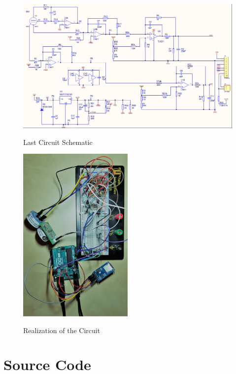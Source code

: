 \begin{figure}
	\begin{center}
		\includegraphics[width=1\textwidth]{Pics/6}
		\caption{Last Circuit Schematic}
		\label{fig:A.3}
		\vspace{1.2cm}
		\includegraphics[width=0.5\textwidth]{Pics/7}
		\caption{Realization of the Circuit}
		\label{fig:A.4}
		\medskip
	\end{center}
\end{figure}

\chapter{Source Code}
\label{sub:appendixA}

